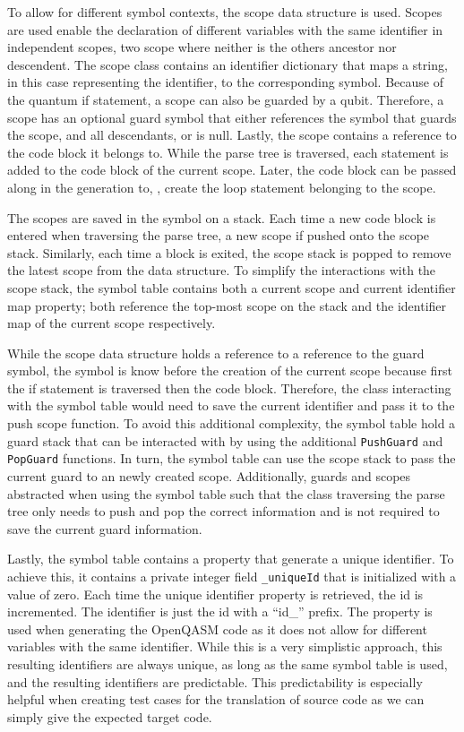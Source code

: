 To allow for different symbol contexts, the scope data structure is used. Scopes are used enable the declaration of different variables with the same identifier in independent scopes, \ie two scope where neither is the others ancestor nor descendent. The scope class contains an identifier dictionary that maps a string, in this case representing the identifier, to the corresponding symbol. Because of the quantum if statement, a scope can also be guarded by a qubit. Therefore, a scope has an optional guard symbol that either references the symbol that guards the scope, and all descendants, or is null. Lastly, the scope contains a reference to the code block it belongs to. While the parse tree is traversed, each statement is added to the code block of the current scope. Later, the code block can be passed along in the generation to, \eg, create the loop statement belonging to the scope. 

The scopes are saved in the symbol on a stack. Each time a new code block is entered when traversing the parse tree, a new scope if pushed onto the scope stack. Similarly, each time a block is exited, the scope stack is popped to remove the latest scope from the data structure. To simplify the interactions with the scope stack, the symbol table contains both a current scope and current identifier map property; both reference the top-most scope on the stack and the identifier map of the current scope respectively.

While the scope data structure holds a reference to a reference to the guard symbol, the symbol is know before the creation of the current scope because first the if statement is traversed then the code block. Therefore, the class interacting with the symbol table would need to save the current identifier and pass it to the push scope function. To avoid this additional complexity, the symbol table hold a guard stack that can be interacted with by using the additional \texttt{PushGuard} and \texttt{PopGuard} functions. In turn, the symbol table can use the scope stack to pass the current guard to an newly created scope. Additionally, guards and scopes abstracted when using the symbol table such that the class traversing the parse tree only needs to push and pop the correct information and is not required to save the current guard information. 

Lastly, the symbol table contains a property that generate a unique identifier. To achieve this, it contains a private integer field \texttt{\_uniqueId} that is initialized with a value of zero. Each time the unique identifier property is retrieved, the id is incremented. The identifier is just the id with a ``id\_'' prefix. The property is used when generating the OpenQASM code as it does not allow for different variables with the same identifier. While this is a very simplistic approach, this resulting identifiers are always unique, as long as the same symbol table is used, and the resulting identifiers are predictable. This predictability is especially helpful when creating test cases for the translation of source code as we can simply give the expected target code. 